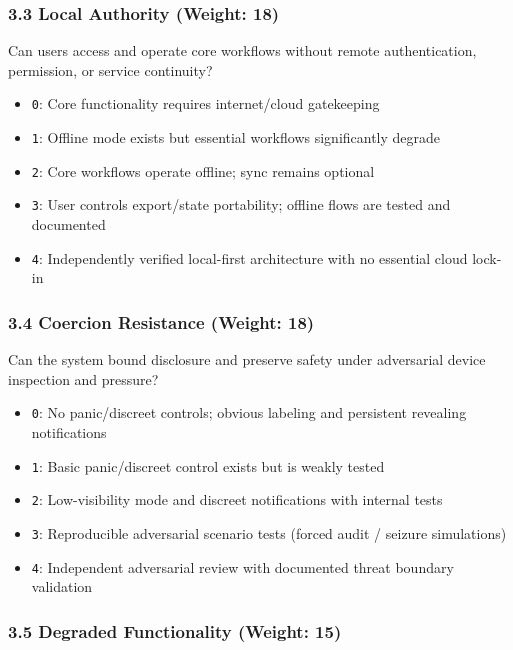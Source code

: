 \documentclass[
]{article}
\providecommand{\tightlist}{%
  \setlength{\itemsep}{0pt}\setlength{\parskip}{0pt}}
\begin{document}
\subsubsection{3.3 Local Authority (Weight:
18)}\label{33-local-authority-weight-18}

Can users access and operate core workflows without remote
authentication, permission, or service continuity?

\begin{itemize}
\tightlist
\item
  \texttt{0}: Core functionality requires internet/cloud gatekeeping
\item
  \texttt{1}: Offline mode exists but essential workflows significantly
  degrade
\item
  \texttt{2}: Core workflows operate offline; sync remains optional
\item
  \texttt{3}: User controls export/state portability; offline flows are
  tested and documented
\item
  \texttt{4}: Independently verified local-first architecture with no
  essential cloud lock-in
\end{itemize}

\subsubsection{3.4 Coercion Resistance (Weight:
18)}\label{34-coercion-resistance-weight-18}

Can the system bound disclosure and preserve safety under adversarial
device inspection and pressure?

\begin{itemize}
\tightlist
\item
  \texttt{0}: No panic/discreet controls; obvious labeling and
  persistent revealing notifications
\item
  \texttt{1}: Basic panic/discreet control exists but is weakly tested
\item
  \texttt{2}: Low-visibility mode and discreet notifications with
  internal tests
\item
  \texttt{3}: Reproducible adversarial scenario tests (forced audit /
  seizure simulations)
\item
  \texttt{4}: Independent adversarial review with documented threat
  boundary validation
\end{itemize}

\subsubsection{3.5 Degraded Functionality (Weight:
15)}\label{35-degraded-functionality-weight-15}
\end{document}
